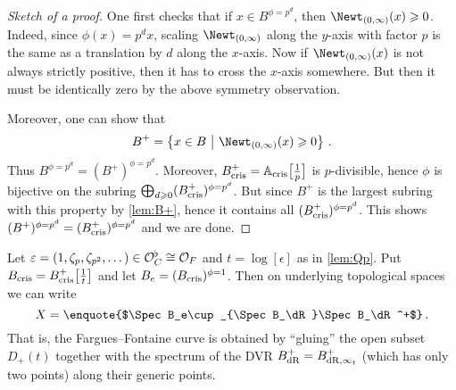\begin{proof}[Sketch of a proof]
	One first checks that if $x\in B^{\phi=p^d}$, then $\Newt_{(0,\infty)}(x)\geq 0$. Indeed, since $\phi(x)=p^dx$, scaling $\Newt_{(0,\infty)}$ along the $y$-axis with factor $p$ is the same as a translation by $d$ along the $x$-axis. Now if $\Newt_{(0,\infty)}(x)$ is not always strictly positive, then it has to cross the $x$-axis somewhere. But then it must be identically zero by the above symmetry observation.
	
	Moreover, one can show that
	\begin{equation*}
		B^+=\left\{x\in B\st\Newt_{(0,\infty)}(x)\geq 0\right\}\,.
	\end{equation*}
	Thus $B^{\phi=p^d}=(B^+)^{\phi=p^d}$. Moreover, $B_{\mathrm{cris}}^+=\mathbb{A}_{\mathrm{cris}}\big[\textstyle\frac{1}{p}\big]$ is $p$-divisible, hence $\phi$ is bijective on the subring $\bigoplus_{d\geq 0}(B_\cris^+)^{\smash{\phi=p^d}}$. But since $B^+$ is the largest subring with this property by \cref{lem:B+}, hence it contains all $(B_\cris^+)^{\phi=p^d}$. This shows $(B^+)^{\phi=p^d}=(B_\cris^+)^{\phi=p^d}$ and we are done.
\end{proof}
\begin{rem}
	Let $\varepsilon=(1,\zeta_p,\zeta_{p^2},\dotsc)\in \mathcal{O}_C^\flat\cong \mathcal{O}_F$ and $t=\log{[\epsilon]}$ as in \cref{lem:Qp}. Put $B_{\mathrm{cris}}=B_{\mathrm{cris}}^+\big[\textstyle\frac{1}{t}\big]$ and let $B_e=(B_\cris)^{\phi=1}$. Then on underlying topological spaces we can write
	\begin{equation*}
		X=\text{\enquote{$\Spec B_e\cup_{\Spec B_\dR}\Spec B_\dR^+$}}\,.
	\end{equation*}
	That is, the Fargues--Fontaine curve is obtained by \enquote{gluing} the open subset $D_+(t)$ together with the spectrum of the DVR $B_{\mathrm{dR}}^+=B_{\mathrm{dR},\infty_t}^+$ (which has only two points) along their generic points.
\end{rem}